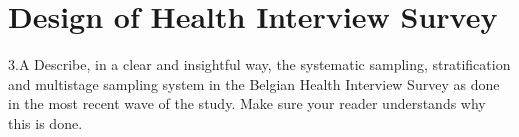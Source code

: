 \section{Design of Health Interview Survey}
3.A Describe, in a clear and insightful way, the systematic sampling, stratification and multistage
sampling system in the Belgian Health Interview Survey as done in the most recent wave
of the study. Make sure your reader understands why this is done.
\endinput